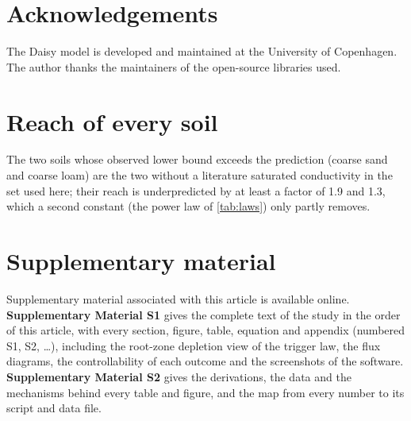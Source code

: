\documentclass[review,12pt,authoryear]{elsarticle}
\begin{document}
\section*{Acknowledgements}
The Daisy model is developed and maintained at the University of Copenhagen. The author thanks the maintainers of the open-source libraries used.

\appendix
\section{Reach of every soil}\label{app:reach}
The two soils whose observed lower bound exceeds the prediction (coarse sand and coarse loam) are the two without a literature saturated conductivity in the set used here; their reach is underpredicted by at least a factor of 1.9 and 1.3, which a second constant (the power law of \cref{tab:laws}) only partly removes.

\section*{Supplementary material}
Supplementary material associated with this article is available online. \textbf{Supplementary Material S1} gives the complete text of the study in the order of this article, with every section, figure, table, equation and appendix (numbered S1, S2, \ldots), including the root-zone depletion view of the trigger law, the flux diagrams, the controllability of each outcome and the screenshots of the software. \textbf{Supplementary Material S2} gives the derivations, the data and the mechanisms behind every table and figure, and the map from every number to its script and data file.



\end{document}
